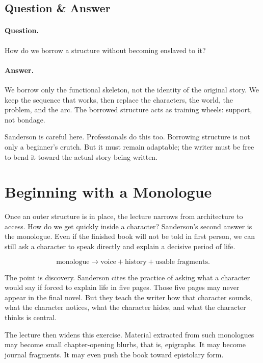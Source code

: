 \subsection{Question \& Answer}

\paragraph{Question.} How do we borrow a structure without becoming enslaved to it?

\paragraph{Answer.} We borrow only the functional skeleton, not the identity of the original story. We keep the sequence that works, then replace the characters, the world, the problem, and the arc. The borrowed structure acts as training wheels: support, not bondage.

Sanderson is careful here. Professionals do this too. Borrowing structure is not only a beginner's crutch. But it must remain adaptable; the writer must be free to bend it toward the actual story being written.

\section{Beginning with a Monologue}

Once an outer structure is in place, the lecture narrows from architecture to access. How do we get quickly inside a character? Sanderson's second answer is the monologue. Even if the finished book will not be told in first person, we can still ask a character to speak directly and explain a decisive period of life.

\begin{equation}
\text{monologue} \to \text{voice} + \text{history} + \text{usable fragments}.
\end{equation}

The point is discovery. Sanderson cites the practice of asking what a character would say if forced to explain life in five pages. Those five pages may never appear in the final novel. But they teach the writer how that character sounds, what the character notices, what the character hides, and what the character thinks is central.

The lecture then widens this exercise. Material extracted from such monologues may become small chapter-opening blurbs, that is, epigraphs. It may become journal fragments. It may even push the book toward epistolary form.

